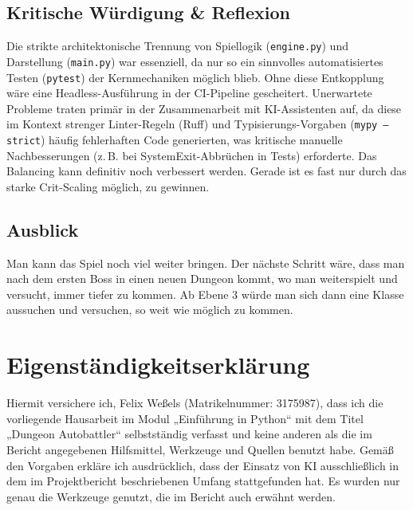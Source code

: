 \documentclass[12pt, a4paper]{article}
\begin{document}
\subsection{Kritische Würdigung \& Reflexion}
Die strikte architektonische Trennung von Spiellogik (\texttt{engine.py}) und Darstellung (\texttt{main.py}) war essenziell, da nur so ein sinnvolles automatisiertes Testen (\texttt{pytest}) der Kernmechaniken möglich blieb.
Ohne diese Entkopplung wäre eine Headless-Ausführung in der CI-Pipeline gescheitert.
Unerwartete Probleme traten primär in der Zusammenarbeit mit KI-Assistenten auf, da diese im Kontext strenger Linter-Regeln (Ruff) und Typisierungs-Vorgaben (\texttt{mypy --strict}) häufig fehlerhaften Code generierten, was kritische manuelle Nachbesserungen (z.\,B. bei SystemExit-Abbrüchen in Tests) erforderte.
Das Balancing kann definitiv noch verbessert werden.
Gerade ist es fast nur durch das starke Crit-Scaling möglich, zu gewinnen.

\subsection{Ausblick}
Man kann das Spiel noch viel weiter bringen.
Der nächste Schritt wäre, dass man nach dem ersten Boss in einen neuen Dungeon kommt, wo man weiterspielt und versucht, immer tiefer zu kommen.
Ab Ebene 3 würde man sich dann eine Klasse aussuchen und versuchen, so weit wie möglich zu kommen.
\newpage

\section*{Eigenständigkeitserklärung}

Hiermit versichere ich, Felix Weßels (Matrikelnummer: 3175987), dass ich die vorliegende Hausarbeit im Modul „Einführung in Python“ mit dem Titel „Dungeon Autobattler“ selbstständig verfasst und keine anderen als die im Bericht angegebenen Hilfsmittel, Werkzeuge und Quellen benutzt habe.
Gemäß den Vorgaben erkläre ich ausdrücklich, dass der Einsatz von KI ausschließlich in dem im Projektbericht beschriebenen Umfang stattgefunden hat.
Es wurden nur genau die Werkzeuge genutzt, die im Bericht auch erwähnt werden.
\vspace{2cm}

\printbibliography

\newpage
\appendix
\end{document}
